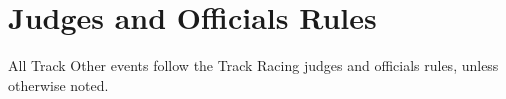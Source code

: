 \chapter{Judges and Officials Rules}

All Track Other events follow the Track Racing judges and officials rules, unless otherwise noted.
